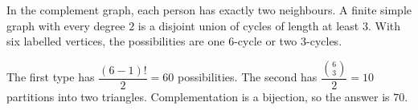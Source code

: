 In the complement graph, each person has exactly two neighbours. A finite simple graph with every degree $2$ is a disjoint union of cycles of length at least $3$. With six labelled vertices, the possibilities are one $6$-cycle or two $3$-cycles.

The first type has $\dfrac{(6-1)!}{2}=60$ possibilities. The second has $\dfrac{\binom63}{2}=10$ partitions into two triangles. Complementation is a bijection, so the answer is $\boxed{70}$.
